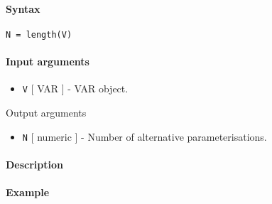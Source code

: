 


	\paragraph{Syntax}

\begin{verbatim}
N = length(V)
\end{verbatim}

\paragraph{Input arguments}

\begin{itemize}
\itemsep1pt\parskip0pt
\item
  \texttt{V} {[} VAR {]} - VAR object.
\end{itemize}

Output arguments

\begin{itemize}
\itemsep1pt\parskip0pt
\item
  \texttt{N} {[} numeric {]} - Number of alternative parameterisations.
\end{itemize}

\paragraph{Description}

\paragraph{Example}



